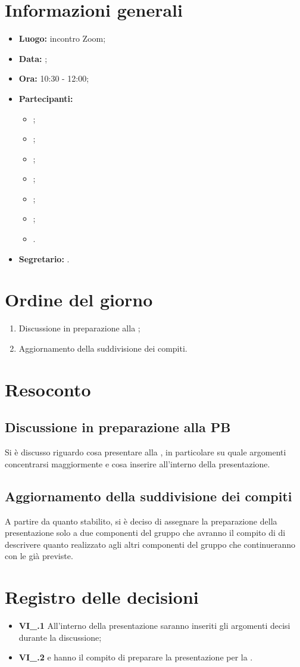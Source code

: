 \section{Informazioni generali}
\begin{itemize}
	\item \textbf{Luogo:} incontro Zoom;
	\item \textbf{Data:} \Data;
	\item \textbf{Ora:} 10:30 - 12:00;
	\item \textbf{Partecipanti:}
	\begin{itemize}
		\item \BL{}; 
		\item \FF{};
		\item \MM{}; 
		\item \PC{};
		\item \TG{};
		\item \TL{};
		\item \VD{}.
	\end{itemize} 
	\item \textbf{Segretario:} \FF{}.
\end{itemize}

\section{Ordine del giorno}
\begin{enumerate}
	\item Discussione in preparazione alla ;
	\item Aggiornamento della suddivisione dei compiti.
\end{enumerate}

\section{Resoconto}
\subsection{Discussione in preparazione alla PB}
Si è discusso riguardo cosa presentare alla , in particolare su quale argomenti concentrarsi maggiormente e cosa inserire all'interno della presentazione. 
\subsection{Aggiornamento della suddivisione dei compiti}
A partire da quanto stabilito, si è deciso di assegnare la preparazione della presentazione solo a due componenti del gruppo che avranno il compito di di descrivere quanto realizzato agli altri componenti del gruppo che continueranno con le  già previste. 

\section{Registro delle decisioni}
\begin{itemize}
	\item \textbf{VI\_\Data.1} 
	All'interno della presentazione saranno inseriti gli argomenti decisi durante la discussione;
	\item \textbf{VI\_\Data.2} 
	\FF e \TL hanno il compito di preparare la presentazione per la .
\end{itemize}